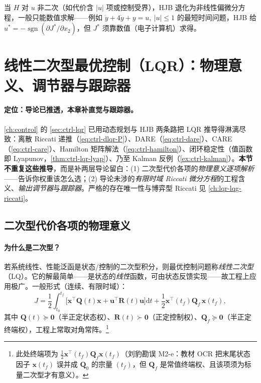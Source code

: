 \noindent 当 $H$ 对 $u$ 非二次（如代价含 $|u|$ 项或控制受界），HJB 退化为非线性偏微分方程，一般只能数值求解——例如 $\ddot y+4\dot y+y=u,\ |u|\le1$ 的最短时间问题，HJB 给 $u^*=-\operatorname{sgn}(\partial J^*/\partial x_2)$，但 $J^*$ 须靠数值（电子计算机）求得。

\section{线性二次型最优控制（LQR）：物理意义、调节器与跟踪器}
\label{sec:oc-lqr}

\paragraph{定位：导论已推透，本章补直觉与跟踪器。}
\cref{ch:control} 的 \cref{sec:ctrl-lqr} 已用动态规划与 HJB 两条路把 LQR 推导得淋漓尽致：离散 Riccati 递推（\cref{eq:ctrl-dlqr-P}）、DARE（\cref{eq:ctrl-dare}）、CARE（\cref{eq:ctrl-care}）、Hamilton 矩阵解法（\cref{eq:ctrl-hamilton}）、闭环稳定性（值函数即 Lyapunov，\cref{thm:ctrl-lqr-lyap}）、乃至 Kalman 反例（\cref{ex:ctrl-kalman}）。\textbf{本节不重复这些推导}，而是补两层导论留白：(1) 二次型代价各项的\emph{物理意义逐项解析}——告诉你权重该怎么选；(2) 导论未涉的\emph{有限时域 Riccati 微分方程}的工程含义、\emph{输出调节器}与\emph{跟踪器}。严格的存在唯一性与博弈型 Riccati 见 \cref{ch:lqr-lqg-riccati}。

\subsection{二次型代价各项的物理意义}
\label{sec:oc-quadratic-meaning}

\paragraph{为什么是二次型？}
若系统线性、性能泛函是状态/控制的二次型积分，则最优控制问题称\emph{线性二次型}（LQ）。它的解最简单——是状态的\emph{线性}函数，可由状态反馈实现——故工程上应用极广\cite{liubao2006modern}。一般形式（连续、有限时域）：
\begin{equation}
  J=\frac12\int_{t_0}^{t_f}\big[\mathbf x^\top\mathbf Q(t)\mathbf x+\mathbf u^\top\mathbf R(t)\mathbf u\big]\mathrm dt+\frac12\mathbf x^\top(t_f)\mathbf Q_f\,\mathbf x(t_f),
  \label{eq:oc-lq-cost}
\end{equation}
其中 $\mathbf Q(t)\succeq\mathbf0$（半正定状态权）、$\mathbf R(t)\succ\mathbf0$（正定控制权）、$\mathbf Q_f\succeq\mathbf0$（半正定终端权），工程上常取对角常阵。\footnote{此处终端项为 $\tfrac12\mathbf x^\top(t_f)\mathbf Q_f\mathbf x(t_f)$（刘豹勘误 M2-e：教材 OCR 把末尾状态因子 $\mathbf x(t_f)$ 误并成 $\mathbf Q_0$ 的宗量 $(t_f)$，但 $\mathbf Q_f$ 是常值终端权、且该项须为标量二次型才有意义）。}

